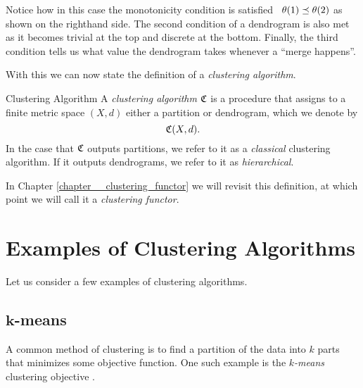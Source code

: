 \begin{example}{}{}
\begin{center}
\begin{minipage}{\linewidth}
\label{fig:dendrogram_example}
\end{minipage}
\end{center}
Notice how in this case the monotonicity condition is satisfied \eg\ $\theta(1) \preceq \theta(2)$ as shown on the righthand side. The second condition of a dendrogram is also met as it becomes trivial at the top and discrete at the bottom. Finally, the third condition tells us what value the dendrogram takes whenever a ``merge happens''.
\end{example}

With this we can now state the definition of a \emph{clustering algorithm}.

\begin{definition}{Clustering Algorithm}{}
A \emph{clustering algorithm} $\mathfrak{C}$ is a procedure that assigns to a finite metric space $(X,d)$ either a partition or dendrogram, which we denote by
$$
\mathfrak{C}(X,d).
$$
In the case that $\mathfrak{C}$ outputs partitions, we refer to it as a \emph{classical} clustering algorithm. If it outputs dendrograms, we refer to it as \emph{hierarchical}.
\end{definition}

In Chapter \ref{chapter__clustering_functor} we will revisit this definition, at which point we will call it a \emph{clustering functor}.


\section{Examples of Clustering Algorithms}

Let us consider a few examples of clustering algorithms.

\subsection[$k$-means]{$\boldsymbol{k}$-means}
A common method of clustering is to find a partition of the data into $k$ parts that minimizes some objective function.
One such example is the \emph{$k$-means} clustering objective \cite[Sec.~3.1]{Scitovski2021}.

